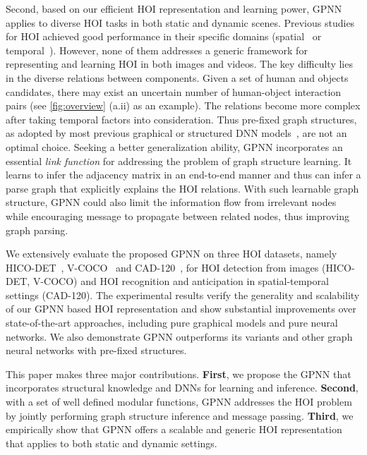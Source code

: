 \documentclass[runningheads]{llncs}
\begin{document}
Second, based on our efficient HOI representation and learning power, GPNN applies to diverse HOI tasks in both static and dynamic scenes. Previous studies for HOI achieved good performance in their specific domains (spatial~\cite{chao2017learning,gkioxari2017detecting} or temporal~\cite{jain2016structural,qi2017predicting,qi2018generalized}). However, none of them addresses a generic framework for representing and learning HOI in both images and videos. The key difficulty lies in the diverse relations between components. Given a set of human and objects candidates, there may exist an uncertain number of human-object interaction pairs (see \autoref{fig:overview} (a.ii) as an example). The relations become more complex after taking temporal factors into consideration. Thus pre-fixed graph structures, as adopted by most previous graphical or structured DNN models~\cite{koppula2016anticipating,jain2016structural,Wang_2018_CVPR,Fang2018}, are not an optimal choice. Seeking a better generalization ability, GPNN incorporates an essential \textit{link function} for addressing the problem of graph structure learning. It learns to infer the adjacency matrix in an end-to-end manner and thus can infer a parse graph that explicitly explains the HOI relations. With such learnable graph structure, GPNN could also limit the information flow from irrelevant nodes while encouraging message to propagate between related nodes, thus improving graph parsing.

We extensively evaluate the proposed GPNN on three HOI datasets, namely HICO-DET~\cite{chao2017learning}, V-COCO~\cite{gupta2015visual} and CAD-120~\cite{koppula2016anticipating}, for HOI detection from images (HICO-DET, V-COCO) and HOI recognition and anticipation in spatial-temporal settings (CAD-120). The experimental results verify the generality and scalability of our GPNN based HOI representation and show substantial improvements over state-of-the-art approaches, including pure graphical models and pure neural networks. We also demonstrate GPNN outperforms its variants and other graph neural networks with pre-fixed structures.

This paper makes three major contributions. \textbf{First}, we propose the GPNN that incorporates structural knowledge and DNNs for learning and inference. \textbf{Second}, with a set of well defined modular functions, GPNN addresses the HOI problem by jointly performing graph structure inference and message passing. \textbf{Third}, we empirically show that GPNN offers a scalable and generic HOI representation that applies to both static and dynamic settings.
\end{document}
